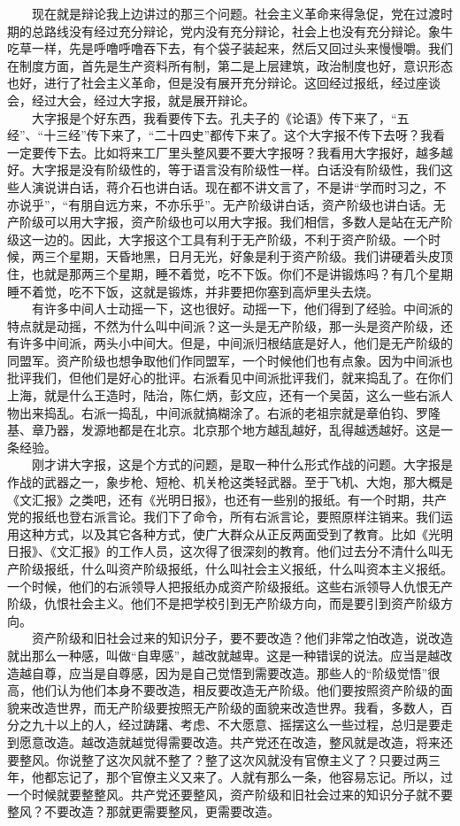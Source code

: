 \documentclass[cn,11pt,chinese]{elegantbook}
\begin{document}
　　现在就是辩论我上边讲过的那三个问题。社会主义革命来得急促，党在过渡时期的总路线没有经过充分辩论，党内没有充分辩论，社会上也没有充分辩论。象牛吃草一样，先是呼噜呼噜吞下去，有个袋子装起来，然后又回过头来慢慢嚼。我们在制度方面，首先是生产资料所有制，第二是上层建筑，政治制度也好，意识形态也好，进行了社会主义革命，但是没有展开充分辩论。这回经过报纸，经过座谈会，经过大会，经过大字报，就是展开辩论。\\
　　大字报是个好东西，我看要传下去。孔夫子的《论语》传下来了，“五经”、“十三经”传下来了，“二十四史”都传下来了。这个大字报不传下去呀？我看一定要传下去。比如将来工厂里头整风要不要大字报呀？我看用大字报好，越多越好。大字报是没有阶级性的，等于语言没有阶级性一样。白话没有阶级性，我们这些人演说讲白话，蒋介石也讲白话。现在都不讲文言了，不是讲“学而时习之，不亦说乎”，“有朋自远方来，不亦乐乎”。无产阶级讲白话，资产阶级也讲白话。无产阶级可以用大字报，资产阶级也可以用大字报。我们相信，多数人是站在无产阶级这一边的。因此，大字报这个工具有利于无产阶级，不利于资产阶级。一个时候，两三个星期，天昏地黑，日月无光，好象是利于资产阶级。我们讲硬着头皮顶住，也就是那两三个星期，睡不着觉，吃不下饭。你们不是讲锻炼吗？有几个星期睡不着觉，吃不下饭，这就是锻炼，并非要把你塞到高炉里头去烧。\\
　　有许多中间人士动摇一下，这也很好。动摇一下，他们得到了经验。中间派的特点就是动摇，不然为什么叫中间派？这一头是无产阶级，那一头是资产阶级，还有许多中间派，两头小中间大。但是，中间派归根结底是好人，他们是无产阶级的同盟军。资产阶级也想争取他们作同盟军，一个时候他们也有点象。因为中间派也批评我们，但他们是好心的批评。右派看见中间派批评我们，就来捣乱了。在你们上海，就是什么王造时，陆治，陈仁炳，彭文应，还有一个吴茵，这么一些右派人物出来捣乱。右派一捣乱，中间派就搞糊涂了。右派的老祖宗就是章伯钧、罗隆基、章乃器，发源地都是在北京。北京那个地方越乱越好，乱得越透越好。这是一条经验。\\
　　刚才讲大字报，这是个方式的问题，是取一种什么形式作战的问题。大字报是作战的武器之一，象步枪、短枪、机关枪这类轻武器。至于飞机、大炮，那大概是《文汇报》之类吧，还有《光明日报》，也还有一些别的报纸。有一个时期，共产党的报纸也登右派言论。我们下了命令，所有右派言论，要照原样注销来。我们运用这种方式，以及其它各种方式，使广大群众从正反两面受到了教育。比如《光明日报》、《文汇报》的工作人员，这次得了很深刻的教育。他们过去分不清什么叫无产阶级报纸，什么叫资产阶级报纸，什么叫社会主义报纸，什么叫资本主义报纸。一个时候，他们的右派领导人把报纸办成资产阶级报纸。这些右派领导人仇恨无产阶级，仇恨社会主义。他们不是把学校引到无产阶级方向，而是要引到资产阶级方向。\\
　　资产阶级和旧社会过来的知识分子，要不要改造？他们非常之怕改造，说改造就出那么一种感，叫做“自卑感”，越改就越卑。这是一种错误的说法。应当是越改造越自尊，应当是自尊感，因为是自己觉悟到需要改造。那些人的“阶级觉悟”很高，他们认为他们本身不要改造，相反要改造无产阶级。他们要按照资产阶级的面貌来改造世界，而无产阶级要按照无产阶级的面貌来改造世界。我看，多数人，百分之九十以上的人，经过踌躇、考虑、不大愿意、摇摆这么一些过程，总归是要走到愿意改造。越改造就越觉得需要改造。共产党还在改造，整风就是改造，将来还要整风。你说整了这次风就不整了？整了这次风就没有官僚主义了？只要过两三年，他都忘记了，那个官僚主义又来了。人就有那么一条，他容易忘记。所以，过一个时候就要整整风。共产党还要整风，资产阶级和旧社会过来的知识分子就不要整风？不要改造？那就更需要整风，更需要改造。\\
\end{document}
